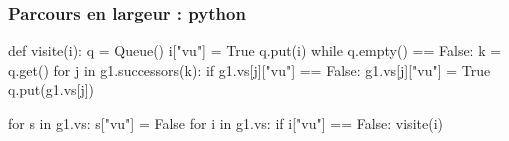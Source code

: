 \begin{frame}[fragile]
\frametitle{Parcours en largeur : python}
    \begin{pythoncode}
def visite(i):
    q = Queue()
    i["vu"] = True
    q.put(i)
    while q.empty() == False:
        k = q.get()
        for j in g1.successors(k):
            if g1.vs[j]["vu"] == False:
                g1.vs[j]["vu"] = True
                q.put(g1.vs[j])

for s in g1.vs:
    s["vu"] = False
for i in g1.vs:
    if i["vu"] == False:
        visite(i)        
    \end{pythoncode}
\end{frame}